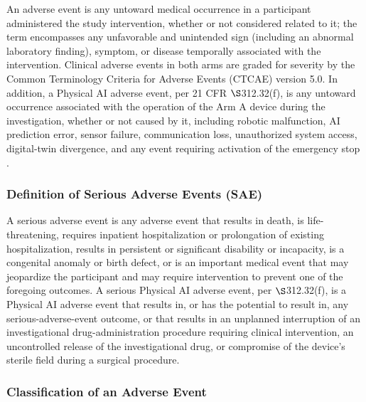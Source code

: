 An adverse event is any untoward medical occurrence in a participant administered the
study intervention, whether or not considered related to it; the term encompasses
any unfavorable and unintended sign (including an abnormal laboratory finding),
symptom, or disease temporally associated with the intervention. Clinical adverse
events in both arms are graded for severity by the Common Terminology Criteria for
Adverse Events (CTCAE) version 5.0. In addition, a Physical AI adverse event, per 21
CFR $\S$312.32(f), is any untoward occurrence associated with the operation of the
Arm A device during the investigation, whether or not caused by it, including robotic
malfunction, AI prediction error, sensor failure, communication loss, unauthorized
system access, digital-twin divergence, and any event requiring activation of the
emergency stop \cite{kawchak2026adapt312}.

\subsubsection{Definition of Serious Adverse Events (SAE)}

A serious adverse event is any adverse event that results in death, is
life-threatening, requires inpatient hospitalization or prolongation of existing
hospitalization, results in persistent or significant disability or incapacity, is a
congenital anomaly or birth defect, or is an important medical event that may
jeopardize the participant and may require intervention to prevent one of the
foregoing outcomes. A serious Physical AI adverse event, per $\S$312.32(f), is a
Physical AI adverse event that results in, or has the potential to result in, any
serious-adverse-event outcome, or that results in an unplanned interruption of an
investigational drug-administration procedure requiring clinical intervention, an
uncontrolled release of the investigational drug, or compromise of the device's
sterile field during a surgical procedure.

\clearpage

\subsubsection{Classification of an Adverse Event}

